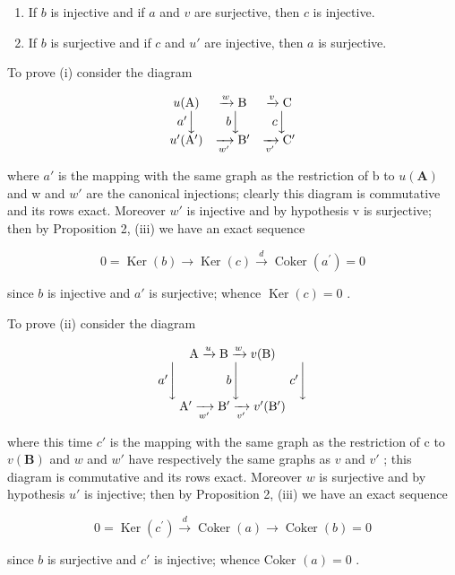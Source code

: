 \begin{enumerate}
\def\labelenumi{(\roman{enumi})}
\item
  If \(b\) is injective and if \(a\) and \(v\) are surjective, then \(c\) is injective.
\item
  If \(b\) is surjective and if \(c\) and \(u'\) are injective, then \(a\) is surjective.
\end{enumerate}

To prove (i) consider the diagram

\[
\begin{array}{c c c} u (\mathrm{A}) & \xrightarrow {w} \mathrm{B} & \xrightarrow {v} \mathrm{C} \\ a ^ {\prime} \Big \downarrow & b \Big \downarrow & c \Big \downarrow \\ u ^ {\prime} (\mathrm{A} ^ {\prime}) & \xrightarrow [ w ^ {\prime} ]{} \mathrm{B} ^ {\prime} & \xrightarrow [ v ^ {\prime} ]{} \mathrm{C} ^ {\prime} \end{array}
\]

where \(a'\) is the mapping with the same graph as the restriction of b to \(u(\mathbf{A})\) and w and \(w'\) are the canonical injections; clearly this diagram is commutative and its rows exact. Moreover \(w'\) is injective and by hypothesis v is surjective; then by Proposition 2, (iii) we have an exact sequence

\[
0 = \operatorname{Ker} (b) \longrightarrow \operatorname{Ker} (c) \stackrel {d} {\longrightarrow} \operatorname{Coker} (a ^ {\prime}) = 0
\]

since \(b\) is injective and \(a'\) is surjective; whence \(\operatorname{Ker}(c) = 0\) .

To prove (ii) consider the diagram

\[
\begin{array}{c} \mathrm{A} \xrightarrow {u} \mathrm{B} \xrightarrow {w} v (\mathrm{B}) \\ a ^ {\prime} \Biggl \downarrow \qquad \qquad b \Biggl \downarrow \qquad \qquad c ^ {\prime} \Biggl \downarrow \\ \mathrm{A} ^ {\prime} \xrightarrow [ w ^ {\prime} ]{} \mathrm{B} ^ {\prime} \xrightarrow [ v ^ {\prime} ]{} v ^ {\prime} (\mathrm{B} ^ {\prime}) \end{array}
\]

where this time \(c'\) is the mapping with the same graph as the restriction of c to \(v(\mathbf{B})\) and \(w\) and \(w'\) have respectively the same graphs as \(v\) and \(v'\) ; this diagram is commutative and its rows exact. Moreover \(w\) is surjective and by hypothesis \(u'\) is injective; then by Proposition 2, (iii) we have an exact sequence

\[
0 = \operatorname{Ker} (c ^ {\prime}) \xrightarrow {d} \operatorname{Coker} (a) \longrightarrow \operatorname{Coker} (b) = 0
\]

since \(b\) is surjective and \(c'\) is injective; whence Coker \((a) = 0\) .

